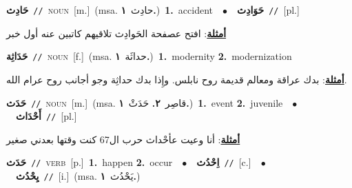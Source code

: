 \documentclass[10pt,a4paper,twoside]{article} %
\begin{document}
\begin{multicols}{2}
{\setlength\topsep{0pt}\textbf{\foreignlanguage{arabic}{حَادِث}}\ {\color{gray}\texttt{//}\color{black}}\ \textsc{noun}\ [m.]\ \color{gray}(msa. \foreignlanguage{arabic}{حادِث}~\foreignlanguage{arabic}{\textbf{١.}})\color{black}\ \textbf{1.}~accident\ \ $\bullet$\ \ \setlength\topsep{0pt}\textbf{\foreignlanguage{arabic}{حَوَادِث}}\ {\color{gray}\texttt{//}\color{black}}\ [pl.]\  \begin{flushright}\color{gray}\foreignlanguage{arabic}{\textbf{\underline{\foreignlanguage{arabic}{أمثلة}}}: افتح عصفحة الحَوادِث تلاقيهم كاتبين عنه أول خبر}\end{flushright}\color{black}} \vspace{2mm}

{\setlength\topsep{0pt}\textbf{\foreignlanguage{arabic}{حَدَاثِة}}\ {\color{gray}\texttt{//}\color{black}}\ \textsc{noun}\ [f.]\ \color{gray}(msa. \foreignlanguage{arabic}{حداثَة}~\foreignlanguage{arabic}{\textbf{١.}})\color{black}\ \textbf{1.}~modernity  \textbf{2.}~modernization\  \begin{flushright}\color{gray}\foreignlanguage{arabic}{\textbf{\underline{\foreignlanguage{arabic}{أمثلة}}}: بدك عراقة ومعالم قديمة روح نابلس. وإِذا بدك حداثِة وجو أجانب روح عرام الله.}\end{flushright}\color{black}} \vspace{2mm}

{\setlength\topsep{0pt}\textbf{\foreignlanguage{arabic}{حَدَث}}\ {\color{gray}\texttt{//}\color{black}}\ \textsc{noun}\ [m.]\ \color{gray}(msa. \foreignlanguage{arabic}{قاصِر}~\foreignlanguage{arabic}{\textbf{٢.}}  \foreignlanguage{arabic}{حَدَثْ}~\foreignlanguage{arabic}{\textbf{١.}})\color{black}\ \textbf{1.}~event  \textbf{2.}~juvenile\ \ $\bullet$\ \ \setlength\topsep{0pt}\textbf{\foreignlanguage{arabic}{أَحْدَاث}}\ {\color{gray}\texttt{//}\color{black}}\ [pl.]\  \begin{flushright}\color{gray}\foreignlanguage{arabic}{\textbf{\underline{\foreignlanguage{arabic}{أمثلة}}}: أنا وعيت عأحْداث حرب ال67 كنت وقتها بعدني صغير}\end{flushright}\color{black}} \vspace{2mm}

{\setlength\topsep{0pt}\textbf{\foreignlanguage{arabic}{حَدَث}}\ {\color{gray}\texttt{//}\color{black}}\ \textsc{verb}\ [p.]\ \textbf{1.}~happen  \textbf{2.}~occur\ \ $\bullet$\ \ \setlength\topsep{0pt}\textbf{\foreignlanguage{arabic}{اِحْدُث}}\ {\color{gray}\texttt{//}\color{black}}\ [c.]\ \ $\bullet$\ \ \setlength\topsep{0pt}\textbf{\foreignlanguage{arabic}{يِحْدُث}}\ {\color{gray}\texttt{//}\color{black}}\ [i.]\ \color{gray}(msa. \foreignlanguage{arabic}{يَحْدُث}~\foreignlanguage{arabic}{\textbf{١.}})\color{black}\ } \vspace{2mm}


\end{multicols}
\end{document}
